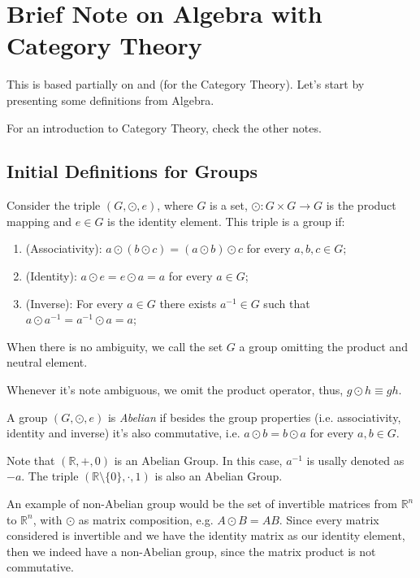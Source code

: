 \section{Brief Note on Algebra with Category Theory}

This is based partially on \citet{garling2011clifford}
and \citet{aluffi2021algebra} (for the Category Theory).
Let's start by presenting some definitions from Algebra.

For an introduction to Category Theory, check the other notes.

\subsection{Initial Definitions for Groups}

\begin{definition}[Groups]
	Consider the triple $(G, \odot, e)$, where $G$ is a set,
	$\odot : G \times G \to G$ is the product mapping
	and $e \in G$ is the identity element.
	This triple is a group if:
	\begin{enumerate}
		\item (Associativity): $a \odot (b \odot c) = (a \odot b) \odot c$ for every $a,b,c \in G$;
		\item (Identity): $a \odot e = e \odot a  = a$ for every $a \in G$;
		\item (Inverse): For every $a \in G$ there exists $a^{-1} \in G$ such that
		      $a\odot a^{-1} = a^{-1}\odot a = a$;
	\end{enumerate}

	When there is no ambiguity, we call the set $G$ a group omitting
	the product and neutral element.
\end{definition}

Whenever it's note ambiguous, we omit the product operator,
thus, $g\odot h \equiv g h$.

\begin{definition}
	A group $(G, \odot, e)$ is \textit{Abelian} if besides the group properties
	(i.e. associativity, identity and inverse)
	it's also commutative, i.e. $a \odot b = b \odot a$ for every $a,b \in G$.
\end{definition}

\begin{example}
	Note that $(\mathbb R, +, 0)$ is an Abelian Group.
	In this case, $a^{-1}$ is usally denoted as $-a$.
	The triple $(\mathbb R \setminus \{0\}, \cdot, 1)$ is also an Abelian Group.

	An example of non-Abelian group would be the set of invertible
	matrices from $\mathbb R^n$ to $\mathbb R^n$,
	with $\odot$ as matrix composition, e.g.
	$A \odot B = A B$. Since every matrix considered is invertible
	and we have the identity matrix as our identity element,
	then we indeed have a non-Abelian group,
	since the matrix product is not commutative.
\end{example}

